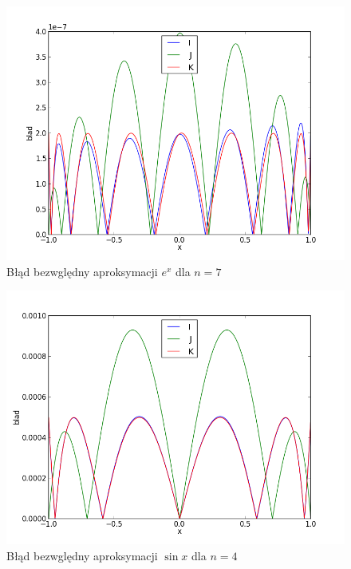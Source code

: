 \documentclass[11pt,leqno]{article}
\begin{document}
\begin{center}
    \begin{figure}[!ht]
        \begin{center}
        \includegraphics{graph0_7.png}
        \caption{Błąd bezwględny aproksymacji $e^x$ dla $n=7$}\label{G:Wykresex7}
    \end{center}
    \end{figure}
\end{center}
\begin{center}
    \begin{figure}[!ht]
        \begin{center}
        \includegraphics{graph1_4.png}
        \caption{Błąd bezwględny aproksymacji $\sin x$ dla $n=4$}\label{G:Wykressin4}
    \end{center}
    \end{figure}
\end{center}
\end{document}
